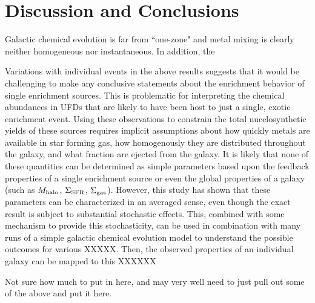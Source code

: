 \section{Discussion and Conclusions}

Galactic chemical evolution is far from ``one-zone" and metal mixing is clearly neither homogeneous nor instantaneous. In addition, the

Variations with individual events in the above results suggests that it would be challenging to make any conclusive statements about the enrichment behavior of single enrichment sources. This is problematic for interpreting the chemical abundances in UFDs that are likely to have been host to just a single, exotic enrichment event. Using these observations to constrain the total nucelosynthetic yields of these sources requires implicit assumptions about how quickly metals are available in star forming gas, how homogenously they are distributed throughout the galaxy, and what fraction are ejected from the galaxy. It is likely that none of these quantities can be determined as simple parameters based upon the feedback properties of a single enrichment source or even the global properties of a galaxy (such as $M_{\rm halo}$, $\Sigma_{\rm SFR}$, $\Sigma_{\rm gas}$). However, this study has shown that these parameters can be characterized in an averaged sense, even though the exact result is subject to substantial stochastic effects. This, combined with some mechanism to provide this stochasticity, can be used in combination with many runs of a simple galactic chemical evolution model to understand the possible outcomes for various XXXXX. Then, the observed properties of an individual galaxy can be mapped to this XXXXXX

Not sure how much to put in here, and may very well need to just pull out some of the above and put it here.


\setcounter{section}{0}%
\renewcommand\thesection{\thechapter.\Alph{section}}

%
%

\renewcommand\thesection{\thechapter.\arabic{section}}
